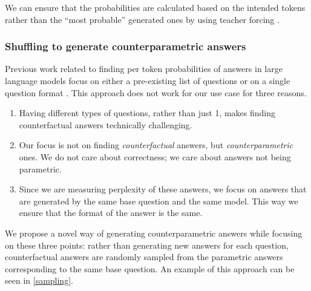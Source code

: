 We can ensure that the probabilities are calculated based on the intended tokens rather than the ``most probable'' generated ones by using teacher forcing \citep{teacher_forcing}.

\subsubsection{Shuffling to generate counterparametric answers}

Previous work related to finding per token probabilities of answers in large language models focus on either a pre-existing list of questions or on a single question format \citep{factual_recall}.
This approach does not work for our use case for three reasons.
\begin{enumerate}
	\item Having \baseqs{} different types of questions, rather than just 1, makes finding counterfactual answers technically challenging.
	\item Our focus is not on finding \emph{counterfactual} answers, but \emph{counterparametric} ones.
		We do not care about correctness; we care about answers not being parametric.
	\item Since we are measuring perplexity of these answers, we focus on answers that are generated by the same base question and the same model.
		This way we ensure that the format of the answer is the same.
\end{enumerate}

We propose a novel way of generating counterparametric answers while focusing on these three points: rather than generating new answers for each question, counterfactual answers are randomly sampled from the parametric answers corresponding to the same base question.
An example of this approach can be seen in \cref{sampling}.

